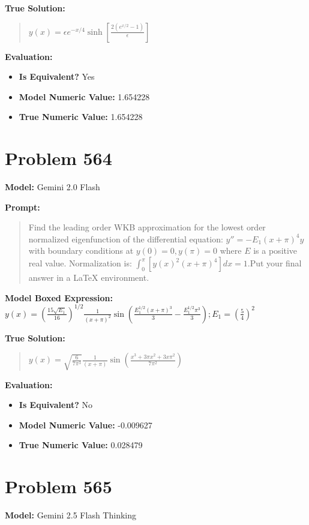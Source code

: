 \documentclass{article}
\begin{document}
\textbf{True Solution:}
\begin{quote}
$y(x) =\epsilon e^{-x/4}\sinh\left[\frac{2\left(e^{x/2}-1\right)}{\epsilon}\right]$
\end{quote}

\textbf{Evaluation:}
\begin{itemize}
\item \textbf{Is Equivalent?} Yes
\item \textbf{Model Numeric Value:} 1.654228
\item \textbf{True Numeric Value:} 1.654228
\end{itemize}
\vspace{1cm}
\section*{Problem 564}
\textbf{Model:} Gemini 2.0 Flash

\textbf{Prompt:}
\begin{quote}
Find the leading order WKB approximation for the lowest order normalized eigenfunction of the differential equation: $y'' = -E_1 (x+\pi)^4 y$ with boundary conditions at $y(0)=0, y(\pi)=0$ where $E$ is a positive real value. Normalization is: $\int_0^\pi [y(x)^2 (x+\pi)^4] dx = 1$.Put your final answer in a LaTeX \boxed{} environment.
\end{quote}
\textbf{Model Boxed Expression:} $y(x) = \left(\frac{15\sqrt{E_1}}{16}\right)^{1/2} \frac{1}{(x+\pi)^2} \sin\left(\frac{E_1^{1/2}(x+\pi)^3}{3} - \frac{E_1^{1/2}\pi^3}{3}\right); E_1 = \left(\frac{5}{4}\right)^2$

\textbf{True Solution:}
\begin{quote}
$y(x)=\sqrt{\frac{6}{7\pi^3 }}\frac{1}{(x +\pi)} \sin(\frac{x^3 + 3 \pi x^2 + 3x \pi^2}{7\pi^2})$
\end{quote}

\textbf{Evaluation:}
\begin{itemize}
\item \textbf{Is Equivalent?} No
\item \textbf{Model Numeric Value:} -0.009627
\item \textbf{True Numeric Value:} 0.028479
\end{itemize}
\vspace{1cm}
\section*{Problem 565}
\textbf{Model:} Gemini 2.5 Flash Thinking
\end{document}
